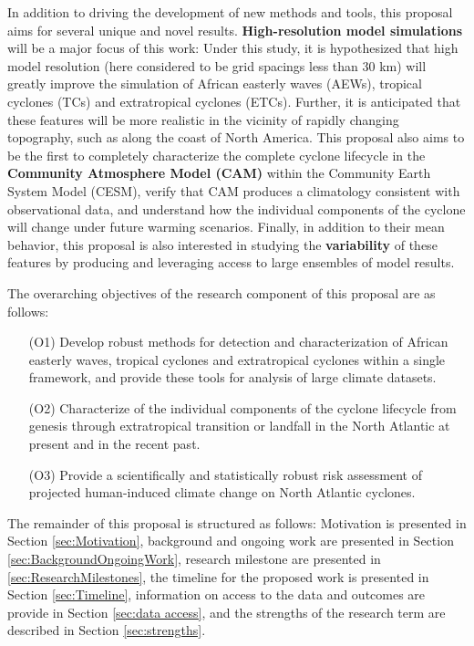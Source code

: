\documentclass[11pt]{article}
\begin{document}
In addition to driving the development of new methods and tools, this proposal aims for several unique and novel results.  \textbf{High-resolution model simulations} will be a major focus of this work:  Under this study, it is hypothesized that high model resolution (here considered to be grid spacings less than 30 km) will greatly improve the simulation of African easterly waves (AEWs), tropical cyclones (TCs) and extratropical cyclones (ETCs).  Further, it is anticipated that these features will be more realistic in the vicinity of rapidly changing topography, such as along the coast of North America.  This proposal also aims to be the first to completely characterize the complete cyclone lifecycle in the \textbf{Community Atmosphere Model (CAM)} within the Community Earth System Model (CESM), verify that CAM produces a climatology consistent with observational data, and understand how the individual components of the cyclone will change under future warming scenarios.  Finally, in addition to their mean behavior, this proposal is also interested in studying the \textbf{variability} of these features by producing and leveraging access to large ensembles of model results.

The overarching objectives of the research component of this proposal are as follows: 

\begin{enumerate}
\item[(O1)] Develop robust methods for detection and characterization of African easterly waves, tropical cyclones and extratropical cyclones within a single framework, and provide these tools for analysis of large climate datasets.

\item[(O2)] Characterize of the individual components of the cyclone lifecycle from genesis through extratropical transition or landfall in the North Atlantic at present and in the recent past.

\item[(O3)] Provide a scientifically and statistically robust risk assessment of projected human-induced climate change on North Atlantic cyclones.
\end{enumerate}

The remainder of this proposal is structured as follows: Motivation is presented in Section \ref{sec:Motivation}, background and ongoing work are presented in Section \ref{sec:BackgroundOngoingWork}, research milestone are presented in \ref{sec:ResearchMilestones}, the timeline for the proposed work is presented in Section \ref{sec:Timeline}, information on access to the data and outcomes are provide in Section \ref{sec:data access}, and the strengths of the research term are described in Section \ref{sec:strengths}.
\end{document}
